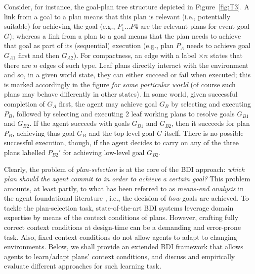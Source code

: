 Consider, for instance, the goal-plan tree structure depicted in
Figure~\ref{fig:T3}.
A link from a goal to a plan means that this plan is relevant (i.e., potentially
suitable) for achieving the goal (e.g., $P_1 \ldots P4$ are the relevant plans
for event-goal $G$); whereas a link from a plan to a goal means that the plan
needs to achieve that goal as part of its (sequential) execution (e.g., plan
$P_A$ needs to achieve goal $G_{A1}$ first and then $G_{A2}$).
For compactness, an edge with a label $\times n$ states that there are $n$ edges
of such type.
Leaf plans directly interact with the environment and so, in a given world state,
they can either succeed or fail when executed; this is marked accordingly in the
figure \emph{for some particular world} (of course such plans may behave
differently in other states).
In some world, given successful completion of $G_A$ first, the agent may achieve
goal $G_B$ by selecting and executing $P_B$, followed by selecting and executing
$2$ leaf working plans to resolve goals $G_{B1}$ and $G_{B2}$. If the agent
succeeds with goals $G_{B1}$ and $G_{B2}$, then it succeeds for plan $P_B$,
achieving thus goal $G_B$ and the top-level goal $G$ itself. There is no possible
successful execution, though, if the agent decides to carry on any of the three
plans labelled $P_{B2}'$ for achieving low-level goal $G_{B2}$.




Clearly, the problem of \textit{plan-selection} is at the core of the BDI
approach:
\emph{which plan should the agent commit to in order to achieve a certain goal?}
This problem amounts, at least partly, to what has been referred to as
\emph{means-end analysis} in the agent foundational literature
\cite{Pollack92-IRMA,Bratman88}, i.e., the decision of \textit{how}
goals are achieved.
To tackle the plan-selection task, state-of-the-art BDI systems leverage domain
expertise by means of the context conditions of plans. However, crafting fully
correct context conditions at design-time can be a
demanding and error-prone task. Also, fixed context conditions do not
allow agents to adapt to changing environments.
Below, we shall provide an extended BDI framework that
allows agents to learn/adapt plans' context conditions, and discuss and empirically
evaluate different approaches for such learning task.


